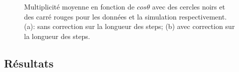 \begin{figure}[!ht]
  \caption{Multiplicité moyenne en fonction de $cos\theta$ avec des cercles noirs et des carré rouges pour les données et la simulation respectivement. (a): sans correction sur la longueur des steps; (b) avec correction sur la longueur des steps. \label{fig.eff_mul_layer}}
\end{figure}


\subsection{Résultats}


